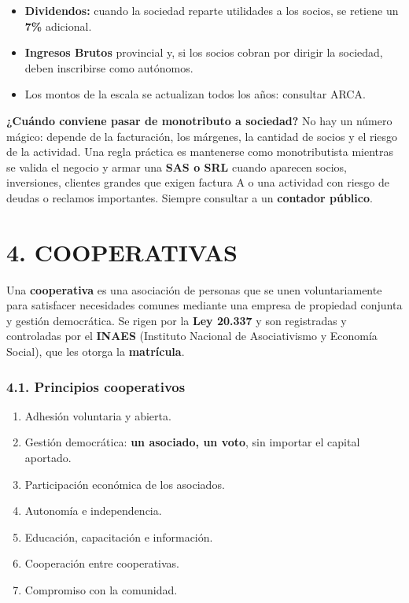 \begin{itemize}
  \item \textbf{Dividendos:} cuando la sociedad reparte utilidades a los socios, se retiene un
        \textbf{7\%} adicional.
  \item \textbf{Ingresos Brutos} provincial y, si los socios cobran por dirigir la sociedad,
        deben inscribirse como autónomos.
  \item Los montos de la escala se actualizan todos los años: consultar ARCA.
\end{itemize}

\begin{recuadro}
\textbf{¿Cuándo conviene pasar de monotributo a sociedad?} No hay un número mágico: depende de
la facturación, los márgenes, la cantidad de socios y el riesgo de la actividad. Una regla
práctica es mantenerse como monotributista mientras se valida el negocio y armar una
\textbf{SAS o SRL} cuando aparecen socios, inversiones, clientes grandes que exigen factura A
o una actividad con riesgo de deudas o reclamos importantes. Siempre consultar a un
\textbf{contador público}.
\end{recuadro}

\section*{4. COOPERATIVAS}

Una \textbf{cooperativa} es una asociación de personas que se unen voluntariamente para
satisfacer necesidades comunes mediante una empresa de propiedad conjunta y gestión
democrática. Se rigen por la \textbf{Ley 20.337} y son registradas y controladas por el
\textbf{INAES} (Instituto Nacional de Asociativismo y Economía Social), que les otorga la
\textbf{matrícula}.

\subsubsection*{4.1. Principios cooperativos}
\begin{enumerate}
  \item Adhesión voluntaria y abierta.
  \item Gestión democrática: \textbf{un asociado, un voto}, sin importar el capital aportado.
  \item Participación económica de los asociados.
  \item Autonomía e independencia.
  \item Educación, capacitación e información.
  \item Cooperación entre cooperativas.
  \item Compromiso con la comunidad.
\end{enumerate}

